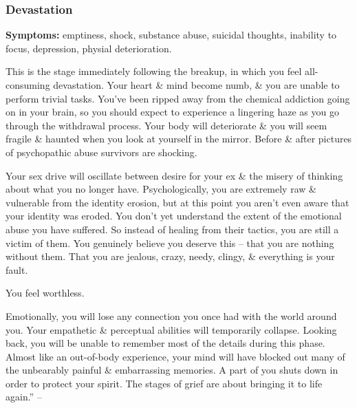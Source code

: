 \documentclass{article}
\numberwithin{equation}{section}
\begin{document}
\subsubsection{Devastation}
\textbf{Symptoms:} emptiness, shock, substance abuse, suicidal thoughts, inability to focus, depression, physial deterioration.

This is the stage immediately following the breakup, in which you feel all-consuming devastation. Your heart \& mind become numb, \& you are unable to perform trivial tasks. You've been ripped away from the chemical addiction going on in your brain, so you should expect to experience a lingering haze as you go through the withdrawal process. Your body will deteriorate \& you will seem fragile \& haunted when you look at yourself in the mirror. Before \& after pictures of psychopathic abuse survivors are shocking.

Your sex drive will oscillate between desire for your ex \& the misery of thinking about what you no longer have. Psychologically, you are extremely raw \& vulnerable from the identity erosion, but at this point you aren't even aware that your identity was eroded. You don't yet understand the extent of the emotional abuse you have suffered. So instead of healing from their tactics, you are still a victim of them. You genuinely believe you deserve this -- that you are nothing without them. That you are jealous, crazy, needy, clingy, \& everything is your fault.

You feel worthless.

Emotionally, you will lose any connection you once had with the world around you. Your empathetic \& perceptual abilities will temporarily collapse. Looking back, you will be unable to remember most of the details during this phase. Almost like an out-of-body experience, your mind will have blocked out many of the unbearably painful \& embarrassing memories. A part of you shuts down in order to protect your spirit. The stages of grief are about bringing it to life again.'' -- \cite[p. 93]{MacKenzie2015}
\end{document}
